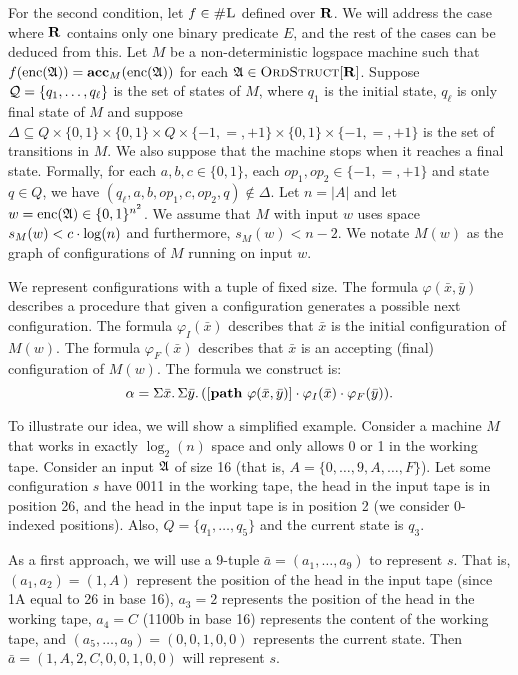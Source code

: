 \vspace{1em}
For the second condition, let $f \in \text{\sc \#L}$ defined over $\mathbf{R}$. We will address the case where $\mathbf{R}$ contains only one binary predicate $E$, and the rest of the cases can be deduced from this. Let $M$ be a non-deterministic logspace machine such that $f({\rm enc}(\mathfrak{A})) = \textbf{acc}_M({\rm enc}(\mathfrak{A}))$ for each $\mathfrak{A} \in \text{\sc OrdStruct}[\mathbf{R}]$. Suppose ${\cal Q} = \{q_1,\ldots,q_{\ell}\}$ is the set of states of $M$, where $q_1$ is the initial state, $q_{\ell}$ is only final state of $M$ and suppose $\Delta \subseteq Q \times \{0,1\} \times \{0,1\} \times Q \times \{-1,=,+1\} \times \{0,1\} \times \{-1,=,+1\}$ is the set of transitions in $M$. We also suppose that the machine stops when it reaches a final state. Formally, for each $a,b,c\in\{0,1\}$, each $op_1,op_2\in\{-1,=,+1\}$ and state $q\in Q$, we have $(q_{\ell},a,b,op_1,c,op_2,q)\not\in\Delta$. Let $n = \vert A \vert$ and let $w = {\rm enc}(\mathfrak{A}) \in \{0,1\}^{n^2}$. We assume that $M$ with input $w$ uses space $s_M(w) < c\cdot\log(n)$ and furthermore, $s_M(w) < n-2$. We notate $M(w)$ as the graph of configurations of $M$ running on input $w$.

We represent configurations with a tuple of fixed size. The formula $\varphi(\bar{x},\bar{y})$ describes a procedure that given a configuration generates a possible next configuration. The formula $\varphi_I(\bar{x})$ describes that $\bar{x}$ is the initial configuration of $M(w)$. The formula $\varphi_F(\bar{x})$ describes that $\bar{x}$ is an accepting (final) configuration of $M(w)$. The formula we construct is:
$$
\alpha = \Sigma{\bar{x}}.\,\Sigma{\bar{y}}.\,([{\bf path} \,\, \varphi(\bar{x},\bar{y})]\cdot \varphi_I(\bar{x})\cdot\varphi_F(\bar{y})).
$$

To illustrate our idea, we will show a simplified example. Consider a machine $M$ that works in exactly $\log_2(n)$ space and only allows 0 or 1 in the working tape. Consider an input $\mathfrak{A}$ of size 16 (that is, $A = \{0,\ldots,9,A,\ldots,F\}$). Let some configuration $s$ have 0011 in the working tape, the head in the input tape is in position 26, and the head in the input tape is in position 2 (we consider 0-indexed positions). Also, $Q = \{q_1,\ldots,q_5\}$ and the current state is $q_3$.

As a first approach, we will use a 9-tuple $\bar{a} = (a_1,\ldots,a_9)$ to represent $s$. That is, $(a_1,a_2) = (1,A)$ represent the position of the head in the input tape (since 1A equal to 26 in base 16), $a_3 = 2$ represents the position of the head in the working tape, $a_4 = C$ (1100b in base 16) represents the content of the working tape, and $(a_5,\ldots,a_9) = (0,0,1,0,0)$ represents the current state. Then $\bar{a} = (1,A,2,C,0,0,1,0,0)$ will represent $s$.

